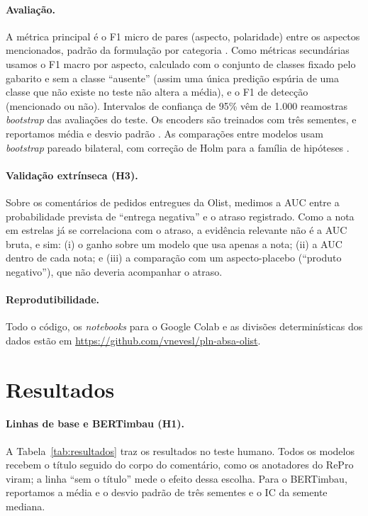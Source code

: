 \documentclass[12pt,a4paper]{article}
\begin{document}
\paragraph{Avaliação.} A métrica principal é o F1 micro de pares (aspecto, polaridade) entre os aspectos mencionados, padrão da formulação por categoria \citep{pontiki2016semeval}. Como métricas secundárias usamos o F1 macro por aspecto, calculado com o conjunto de classes fixado pelo gabarito e sem a classe ``ausente'' (assim uma única predição espúria de uma classe que não existe no teste não altera a média), e o F1 de detecção (mencionado ou não). Intervalos de confiança de 95\% vêm de 1.000 reamostras \emph{bootstrap} das avaliações do teste. Os encoders são treinados com três sementes, e reportamos média e desvio padrão \citep{reimers2017reporting}. As comparações entre modelos usam \emph{bootstrap} pareado bilateral, com correção de Holm para a família de hipóteses \citep{dror2018hitchhiker,holm1979}.

\paragraph{Validação extrínseca (H3).} Sobre os comentários de pedidos entregues da Olist, medimos a AUC entre a probabilidade prevista de ``entrega negativa'' e o atraso registrado. Como a nota em estrelas já se correlaciona com o atraso, a evidência relevante não é a AUC bruta, e sim: (i) o ganho sobre um modelo que usa apenas a nota; (ii) a AUC dentro de cada nota; e (iii) a comparação com um aspecto-placebo (``produto negativo''), que não deveria acompanhar o atraso.

\paragraph{Reprodutibilidade.} Todo o código, os \emph{notebooks} para o Google Colab e as divisões determinísticas dos dados estão em \url{https://github.com/vnevesl/pln-absa-olist}.

\section{Resultados}

\paragraph{Linhas de base e BERTimbau (H1).} A Tabela~\ref{tab:resultados} traz os resultados no teste humano. Todos os modelos recebem o título seguido do corpo do comentário, como os anotadores do RePro viram; a linha ``sem o título'' mede o efeito dessa escolha. Para o BERTimbau, reportamos a média e o desvio padrão de três sementes e o IC da semente mediana.
\end{document}
